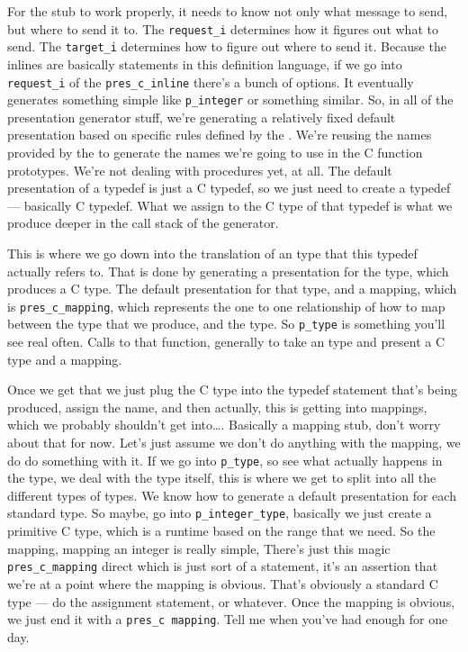 For the stub to work properly, it needs to know not only what message to send,
but where to send it to.  The \texttt{request\_i} determines how it figures out
what to send.  The \texttt{target\_i} determines how to figure out where to
send it.  Because the inlines are basically statements in this definition
language, if we go into \texttt{request\_i} of the \texttt{pres\_c\_inline}
there's a bunch of options.  It eventually generates something simple like
\texttt{p\_integer} or something similar.  So, in all of the presentation
generator stuff, we're generating a relatively fixed default presentation based
on specific rules defined by the \AOI{}\@.  We're reusing the names provided by
the \AOI{} to generate the names we're going to use in the C function prototypes.
We're not dealing with procedures yet, at all.  The default presentation of a
typedef is just a C typedef, so we just need to create a \CAST{} typedef ---
basically C typedef.  What we assign to the C type of that typedef is what we
produce deeper in the call stack of the generator.

This is where we go down into the translation of an \AOI{} type that this typedef
actually refers to.  That is done by generating a presentation for the type,
which produces a C type.  The default presentation for that \AOI{} type, and a
mapping, which is \texttt{pres\_c\_mapping}, which represents the one to one
relationship of how to map between the \MINT{} type that we produce, and the \CAST{}
type.  So \texttt{p\_type} is something you'll see real often.  Calls to that
function, generally to take an \AOI{} type and present a C type and a mapping.

Once we get that we just plug the C type into the typedef statement that's
being produced, assign the name, and then actually, this is getting into
mappings, which we probably shouldn't get into\ldots{}.  Basically a mapping
stub, don't worry about that for now.  Let's just assume we don't do anything
with the mapping, we do do something with it.  If we go into \texttt{p\_type},
so see what actually happens in the type, we deal with the type itself, this is
where we get to split into all the different types of types.  We know how to
generate a default presentation for each standard type.  So maybe, go into
\texttt{p\_integer\_type}, basically we just create a primitive C type, which
is a runtime based on the range that we need.  So the mapping, mapping an
integer is really simple, There's just this magic \texttt{pres\_c\_mapping}
direct which is just sort of a statement, it's an assertion that we're at a
point where the mapping is obvious.  That's obviously a standard C type --- do
the assignment statement, or whatever.  Once the mapping is obvious, we just
end it with a \texttt{pres\_c mapping}.  Tell me when you've had enough for one
day.

